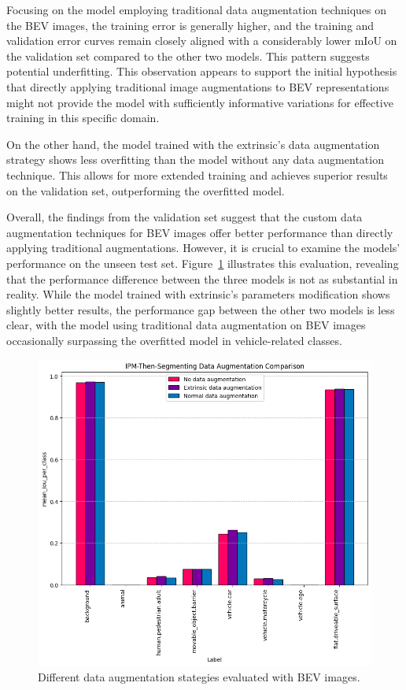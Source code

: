 Focusing on the model employing traditional data augmentation techniques on the BEV images, the training error is generally higher, and the training and validation error curves remain closely aligned with a considerably lower mIoU on the validation set compared to the other two models. This pattern suggests potential underfitting. This observation appears to support the initial hypothesis that directly applying traditional image augmentations to BEV representations might not provide the model with sufficiently informative variations for effective training in this specific domain.

On the other hand, the model trained with the extrinsic's data augmentation strategy shows less overfitting than the model without any data augmentation technique. This allows for more extended training and achieves superior results on the validation set, outperforming the overfitted model. 

Overall, the findings from the validation set suggest that the custom data augmentation techniques for BEV images offer better performance than directly applying traditional augmentations. However, it is crucial to examine the models' performance on the unseen test set. Figure~\ref{fig:bev_before_after_data_aug_test} illustrates this evaluation, revealing that the performance difference between the three models is not as substantial in reality. While the model trained with extrinsic's parameters modification shows slightly better results, the performance gap between the other two models is less clear, with the model using traditional data augmentation on BEV images occasionally surpassing the overfitted model in vehicle-related classes.

\begin{figure}[!ht]
    \centering
    \includegraphics[width=0.7\linewidth]{./images/experiments/bev_before_after_data_aug_test.png}
    \caption{Different data augmentation stategies evaluated with BEV images.}
    \label{fig:bev_before_after_data_aug_test}
\end{figure}

